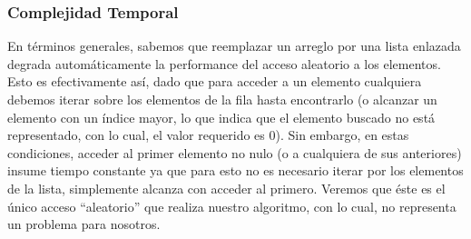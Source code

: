 \subsubsection{Complejidad Temporal}  
 En términos generales, sabemos que reemplazar un arreglo por una lista enlazada degrada automáticamente la performance del acceso aleatorio a los elementos. Esto es efectivamente así, dado que para acceder a un elemento cualquiera debemos iterar sobre los elementos de la fila hasta encontrarlo (o alcanzar un elemento con un índice mayor, lo que indica que el elemento buscado no está representado, con lo cual, el valor requerido es $0$). Sin embargo, en estas condiciones, acceder al primer elemento no nulo (o a cualquiera de sus anteriores) insume tiempo constante ya que para esto no es necesario iterar por los elementos de la lista, simplemente alcanza con acceder al primero. Veremos que éste es el único acceso ``aleatorio'' que realiza nuestro algoritmo, con lo cual, no representa un problema para nosotros.
 
